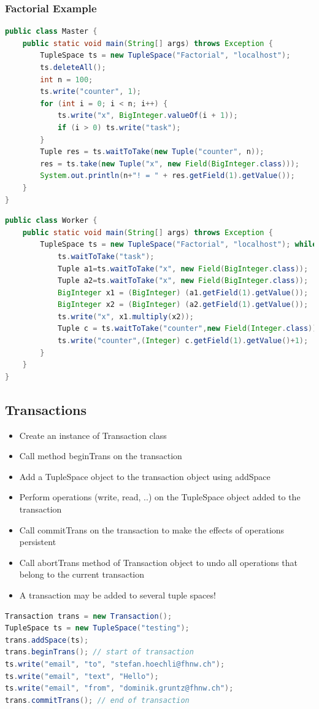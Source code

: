 \documentclass[10pt]{article}
\begin{document}
\subsubsection{Factorial Example}
\begin{lstlisting}[language=Java, caption=Master, style=JavaStyle]
public class Master {
	public static void main(String[] args) throws Exception {
		TupleSpace ts = new TupleSpace("Factorial", "localhost");
		ts.deleteAll();
		int n = 100;
		ts.write("counter", 1);
		for (int i = 0; i < n; i++) {
			ts.write("x", BigInteger.valueOf(i + 1));
			if (i > 0) ts.write("task");
		}
		Tuple res = ts.waitToTake(new Tuple("counter", n));
		res = ts.take(new Tuple("x", new Field(BigInteger.class)));
		System.out.println(n+"! = " + res.getField(1).getValue());
	}
}
\end{lstlisting}
\begin{lstlisting}[language=Java, caption=Worker, style=JavaStyle]
public class Worker {
	public static void main(String[] args) throws Exception {
		TupleSpace ts = new TupleSpace("Factorial", "localhost"); while (true) {
			ts.waitToTake("task");
			Tuple a1=ts.waitToTake("x", new Field(BigInteger.class));
			Tuple a2=ts.waitToTake("x", new Field(BigInteger.class)); 
			BigInteger x1 = (BigInteger) (a1.getField(1).getValue()); 
			BigInteger x2 = (BigInteger) (a2.getField(1).getValue()); 
			ts.write("x", x1.multiply(x2));
			Tuple c = ts.waitToTake("counter",new Field(Integer.class));
			ts.write("counter",(Integer) c.getField(1).getValue()+1);
		}
	}
}
\end{lstlisting}
\subsection{Transactions}
\begin{itemize}
	\item Create an instance of Transaction class
	\item Call method {\color{red}beginTrans} on the transaction
	\item Add a TupleSpace object to the transaction object using {\color{red}addSpace}
	\item Perform operations (write, read, ..) on the TupleSpace object added to the transaction
	\item Call {\color{red}commitTrans} on the transaction to make the effects of operations persistent
	\item Call {\color{red}abortTrans} method of Transaction object to undo all operations that belong to the current transaction
	\item A transaction may be added to several tuple spaces!
\end{itemize}
\begin{lstlisting}[language=Java, caption=Transaction Example, style=JavaStyle]
Transaction trans = new Transaction();
TupleSpace ts = new TupleSpace("testing");
trans.addSpace(ts);
trans.beginTrans(); // start of transaction 
ts.write("email", "to", "stefan.hoechli@fhnw.ch"); 
ts.write("email", "text", "Hello"); 
ts.write("email", "from", "dominik.gruntz@fhnw.ch"); 
trans.commitTrans(); // end of transaction
\end{lstlisting}
\end{document}
